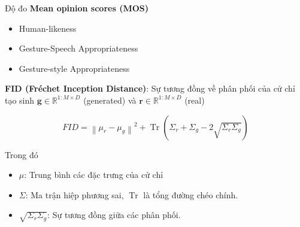 

\begin{frame}{Độ đo}
	\textbf{Mean opinion scores (MOS)}
	
	\begin{itemize}
		\item Human-likeness
		\item Gesture-Speech Appropriateness
		\item Gesture-style Appropriateness
	\end{itemize}
	
	\textbf{FID (Fréchet Inception Distance)}: Sự tương đồng về phân phối của cử chỉ tạo sinh $\mathbf{g} \in \mathbb{R}^{1:M \times D}$ (generated) và $\mathbf{r} \in \mathbb{R}^{1:M \times D}$ (real)
	
	\begin{equation}
	FID = \left\| \mu_r - \mu_g \right\|^2 + \operatorname{Tr}\left( \Sigma_r + \Sigma_g - 2\sqrt{\Sigma_r \Sigma_g} \right)
	\end{equation}
	
	
	Trong đó
	\begin{itemize}
		\item $\mu$: Trung bình các đặc trưng của cử chỉ
		\item $\Sigma$: Ma trận hiệp phương sai, $\operatorname{Tr}$ là tổng đường chéo chính.
		\item $\sqrt{\Sigma_r \Sigma_g}$: Sự tương đồng giữa các phân phối.
	\end{itemize}
	

\end{frame}
